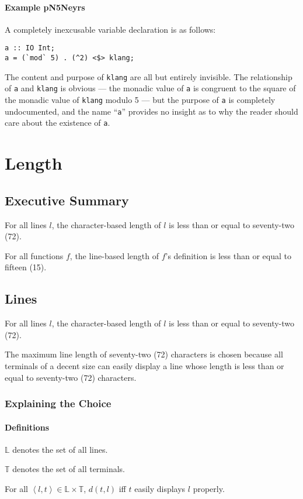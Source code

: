 \documentclass{report}
\begin{document}
\subsubsection{Example pN5Neyrs}
A completely inexcusable variable declaration is as follows:
\begin{lstlisting}
a :: IO Int;
a = (`mod` 5) . (^2) <$> klang;
\end{lstlisting}
The content and purpose of \texttt{klang} are all but entirely invisible.  The relationship of \texttt{a} and \texttt{klang} is obvious --- the monadic value of \texttt{a} is congruent to the square of the monadic value of \texttt{klang} modulo 5 --- but the purpose of \texttt{a} is completely undocumented, and the name ``\texttt{a}'' provides no insight as to why the reader should care about the existence of \texttt{a}.
\chapter{Length}
\section{Executive Summary}
For all lines $l$, the character-based length of $l$ is less than or equal to seventy-two (72).

For all functions $f$, the line-based length of $f$'s definition is less than or equal to fifteen (15).
\section{Lines}
For all lines $l$, the character-based length of $l$ is less than or equal to seventy-two (72).

The maximum line length of seventy-two (72) characters is chosen because all terminals of a decent size can easily display a line whose length is less than or equal to seventy-two (72) characters.
\subsection{Explaining the Choice}
\subsubsection{Definitions}
$\mathbb L$ denotes the set of all lines.

$\mathbb T$ denotes the set of all terminals.

For all $\left\langle l, t\right\rangle \in \mathbb L \times \mathbb T$, $d(t, l)$ iff $t$ easily displays $l$ properly.
\end{document}
